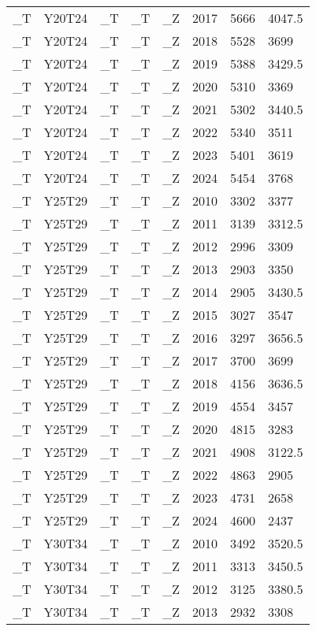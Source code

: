 \begin{longtable}[t]{llllllll}
\_T & Y20T24 & \_T & \_T & \_Z & 2017 & 5666 & 4047.5\\
\_T & Y20T24 & \_T & \_T & \_Z & 2018 & 5528 & 3699\\
\_T & Y20T24 & \_T & \_T & \_Z & 2019 & 5388 & 3429.5\\
\addlinespace
\_T & Y20T24 & \_T & \_T & \_Z & 2020 & 5310 & 3369\\
\_T & Y20T24 & \_T & \_T & \_Z & 2021 & 5302 & 3440.5\\
\_T & Y20T24 & \_T & \_T & \_Z & 2022 & 5340 & 3511\\
\_T & Y20T24 & \_T & \_T & \_Z & 2023 & 5401 & 3619\\
\_T & Y20T24 & \_T & \_T & \_Z & 2024 & 5454 & 3768\\
\addlinespace
\_T & Y25T29 & \_T & \_T & \_Z & 2010 & 3302 & 3377\\
\_T & Y25T29 & \_T & \_T & \_Z & 2011 & 3139 & 3312.5\\
\_T & Y25T29 & \_T & \_T & \_Z & 2012 & 2996 & 3309\\
\_T & Y25T29 & \_T & \_T & \_Z & 2013 & 2903 & 3350\\
\_T & Y25T29 & \_T & \_T & \_Z & 2014 & 2905 & 3430.5\\
\addlinespace
\_T & Y25T29 & \_T & \_T & \_Z & 2015 & 3027 & 3547\\
\_T & Y25T29 & \_T & \_T & \_Z & 2016 & 3297 & 3656.5\\
\_T & Y25T29 & \_T & \_T & \_Z & 2017 & 3700 & 3699\\
\_T & Y25T29 & \_T & \_T & \_Z & 2018 & 4156 & 3636.5\\
\_T & Y25T29 & \_T & \_T & \_Z & 2019 & 4554 & 3457\\
\addlinespace
\_T & Y25T29 & \_T & \_T & \_Z & 2020 & 4815 & 3283\\
\_T & Y25T29 & \_T & \_T & \_Z & 2021 & 4908 & 3122.5\\
\_T & Y25T29 & \_T & \_T & \_Z & 2022 & 4863 & 2905\\
\_T & Y25T29 & \_T & \_T & \_Z & 2023 & 4731 & 2658\\
\_T & Y25T29 & \_T & \_T & \_Z & 2024 & 4600 & 2437\\
\addlinespace
\_T & Y30T34 & \_T & \_T & \_Z & 2010 & 3492 & 3520.5\\
\_T & Y30T34 & \_T & \_T & \_Z & 2011 & 3313 & 3450.5\\
\_T & Y30T34 & \_T & \_T & \_Z & 2012 & 3125 & 3380.5\\
\_T & Y30T34 & \_T & \_T & \_Z & 2013 & 2932 & 3308\\

\end{longtable}
